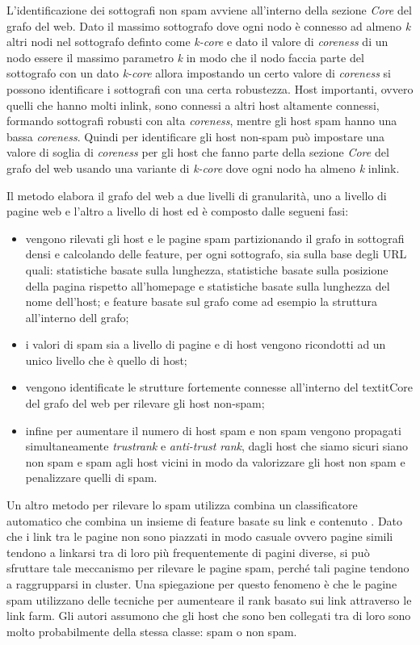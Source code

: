 L'identificazione dei sottografi non spam avviene all'interno della sezione \textit{Core} del grafo del web. Dato il massimo sottografo dove ogni nodo è connesso ad almeno \textit{k} altri nodi nel sottografo definto come \textit{k-core} e dato il valore di \textit{coreness} di un nodo essere il massimo parametro \textit{k} in modo che il nodo faccia parte del sottografo con un dato \textit{k-core} allora impostando un certo valore di \textit{coreness} si possono identificare i sottografi con una certa robustezza. Host importanti, ovvero quelli che hanno molti inlink, sono connessi a altri host altamente connessi, formando sottografi robusti con alta \textit{coreness}, mentre gli host spam hanno una bassa \textit{coreness}. Quindi per identificare gli host non-spam può impostare una valore di  soglia di \textit{coreness} per gli host che fanno parte della sezione \textit{Core} del grafo del web usando una variante di \textit{k-core} dove ogni nodo ha almeno \textit{k} inlink.

Il metodo elabora il grafo del web a due livelli di granularità, uno a livello di pagine web  e l'altro a livello di host ed è composto dalle segueni fasi: 
\begin{itemize}
 \item vengono rilevati gli host e le pagine spam partizionando il grafo in sottografi densi e calcolando delle feature, per ogni sottografo, sia sulla base degli URL quali: statistiche basate sulla lunghezza, statistiche basate sulla posizione della pagina rispetto all'homepage e statistiche basate sulla lunghezza del nome dell'host; e feature basate sul grafo come ad esempio la struttura all'interno dell grafo;
 \item i valori di spam sia a livello di pagine e di host vengono ricondotti ad un unico livello che è quello di host;
 \item vengono identificate le strutture fortemente connesse all'interno del textit{Core} del grafo del web per rilevare gli host non-spam;
 \item infine per aumentare il numero di host spam e non spam vengono propagati simultaneamente \textit{trustrank} e \textit{anti-trust rank}, dagli host che siamo sicuri siano non spam e spam agli host vicini in modo da valorizzare gli host non spam e penalizzare quelli di spam.
\end{itemize}

Un altro metodo per rilevare lo spam utilizza combina  un classificatore automatico che combina un insieme di feature basate su link e contenuto \cite{Castillo:2007:KYN:1277741.1277814}. Dato che i link tra le pagine non sono piazzati in modo casuale ovvero pagine simili tendono a linkarsi tra di loro più frequentemente di pagini diverse, si può sfruttare tale meccanismo per rilevare le pagine spam, perché tali pagine tendono a raggrupparsi in cluster. Una spiegazione per questo fenomeno è che le pagine spam utilizzano delle tecniche per aumenteare il rank basato sui link attraverso le link farm. Gli autori assumono che gli host che sono ben collegati tra di loro sono molto probabilmente della stessa classe: spam o non spam.

